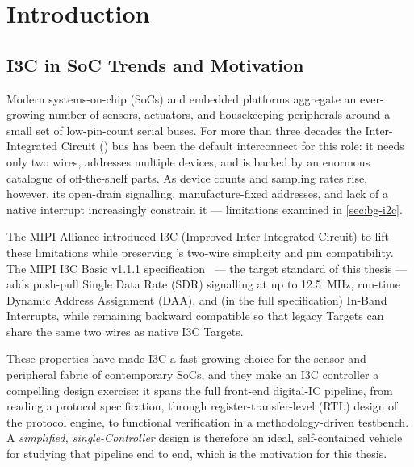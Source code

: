 %
\chapter{Introduction}
\label{ch:intro-full}

\section{I3C in SoC Trends and Motivation}
\label{sec:intro-motivation}

Modern systems-on-chip (SoCs) and embedded platforms aggregate an ever-growing number of sensors,
actuators, and housekeeping peripherals around a small set of low-pin-count serial buses. For more than
three decades the Inter-Integrated Circuit (\iic{}) bus has been the default interconnect for this role:
it needs only two wires, addresses multiple devices, and is backed by an enormous catalogue of
off-the-shelf parts. As device counts and sampling rates rise, however, its open-drain signalling,
manufacture-fixed addresses, and lack of a native interrupt increasingly constrain it --- limitations
examined in \cref{sec:bg-i2c}.

The MIPI Alliance introduced I3C (Improved Inter-Integrated Circuit) to lift these limitations while
preserving \iic{}'s two-wire simplicity and pin compatibility. The MIPI I3C Basic v1.1.1
specification~\cite{mipi_i3c_basic} --- the target standard of this thesis --- adds push-pull Single
Data Rate (SDR) signalling at up to \SI{12.5}{\mega\hertz}, run-time Dynamic Address Assignment (DAA),
and (in the full specification) In-Band Interrupts, while remaining backward compatible so that legacy
\iic{} Targets can share the same two wires as native I3C Targets.

These properties have made I3C a fast-growing choice for the sensor and peripheral fabric of contemporary
SoCs, and they make an I3C controller a compelling design exercise: it spans the full front-end
digital-IC pipeline, from reading a protocol specification, through register-transfer-level (RTL) design
of the protocol engine, to functional verification in a methodology-driven testbench. A
\emph{simplified, single-Controller} design is therefore an ideal, self-contained vehicle for studying
that pipeline end to end, which is the motivation for this thesis.

